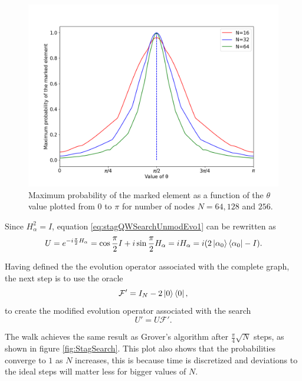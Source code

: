 \documentclass[../../dissertation.tex]{subfiles}
\begin{document}
\begin{figure}[!h]
	\centering
	\includegraphics[scale=0.40]{img/StagQuantumWalk/Search/Theta163264.png}
	\caption{Maximum probability of the marked element as a function of the $\theta$ value plotted from $0$ to $\pi$ for number of nodes $N=64,128$ and $256$.} 
	\label{fig:stagMultTheta}
\end{figure}
Since $H_\alpha^2 = I$, equation \ref{eq:stagQWSearchUnmodEvo1} can be rewritten as
\begin{equation}
	U = e^{-i\frac{\pi}{2} H_\alpha} = \cos{\frac{\pi}{2}I} + i\sin{\frac{\pi}{2}H_\alpha} = i H_\alpha = i(2\ket{\alpha_0}\bra{\alpha_0} - I).
\end{equation}\par
Having defined the the evolution operator associated with the complete graph, the next step is to use the oracle
\begin{equation}
	\mathcal{F'} = I_N - 2\ket{0}\bra{0},
\end{equation}
to create the modified evolution operator associated with the search
\begin{equation}
	U' = U\mathcal{F'}.
\end{equation}\par
The walk achieves the same result as Grover's algorithm after $\frac{\pi}{4}\sqrt{N}$ steps, as shown in figure \ref{fig:StagSearch}. This plot also shows that the probabilities converge to $1$ as $N$ increases, this is because time is discretized and deviations to the ideal steps will matter less for bigger values of $N$.
\end{document}
